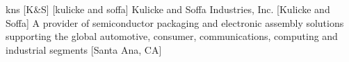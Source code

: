 \newglsXcompany%
{kns}%
[K{\&}S]%
[kulicke and soffa]%
{Kulicke and Soffa Industries, Inc.}%
[Kulicke and Soffa]%
{A provider of semiconductor packaging and electronic assembly solutions supporting the global automotive, consumer, communications, computing and industrial segments \cite{website:Kulicke_and_Soffa}}%
[Santa Ana, CA]%